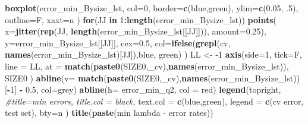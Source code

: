 \documentclass[
]{book}
\newenvironment{Shaded}{\begin{snugshade}}{\end{snugshade}}
\newcommand{\CommentTok}[1]{\textcolor[rgb]{0.56,0.35,0.01}{\textit{#1}}}
\newcommand{\ControlFlowTok}[1]{\textcolor[rgb]{0.13,0.29,0.53}{\textbf{#1}}}
\newcommand{\DataTypeTok}[1]{\textcolor[rgb]{0.13,0.29,0.53}{#1}}
\newcommand{\DecValTok}[1]{\textcolor[rgb]{0.00,0.00,0.81}{#1}}
\newcommand{\FloatTok}[1]{\textcolor[rgb]{0.00,0.00,0.81}{#1}}
\newcommand{\KeywordTok}[1]{\textcolor[rgb]{0.13,0.29,0.53}{\textbf{#1}}}
\newcommand{\NormalTok}[1]{#1}
\newcommand{\OperatorTok}[1]{\textcolor[rgb]{0.81,0.36,0.00}{\textbf{#1}}}
\newcommand{\StringTok}[1]{\textcolor[rgb]{0.31,0.60,0.02}{#1}}
\begin{document}
\begin{Shaded}
\begin{Highlighting}[]
\KeywordTok{boxplot}\NormalTok{(error\_min\_Bysize\_lst,}
  \DataTypeTok{col=}\DecValTok{0}\NormalTok{,}
  \DataTypeTok{border=}\KeywordTok{c}\NormalTok{(}\StringTok{\textquotesingle{}blue\textquotesingle{}}\NormalTok{,}\StringTok{\textquotesingle{}green\textquotesingle{}}\NormalTok{),}
  \DataTypeTok{ylim=}\KeywordTok{c}\NormalTok{(}\FloatTok{0.05}\NormalTok{, }\FloatTok{.5}\NormalTok{),}
  \DataTypeTok{outline=}\NormalTok{F,}
  \DataTypeTok{xaxt=}\StringTok{\textquotesingle{}n\textquotesingle{}}
\NormalTok{)}
\ControlFlowTok{for}\NormalTok{(JJ }\ControlFlowTok{in} \DecValTok{1}\OperatorTok{:}\KeywordTok{length}\NormalTok{(error\_min\_Bysize\_lst))}
\KeywordTok{points}\NormalTok{(}
   \DataTypeTok{x=}\KeywordTok{jitter}\NormalTok{(}\KeywordTok{rep}\NormalTok{(JJ, }\KeywordTok{length}\NormalTok{(error\_min\_Bysize\_lst[[JJ]])), }\DataTypeTok{amount=}\FloatTok{0.25}\NormalTok{), }
   \DataTypeTok{y=}\NormalTok{error\_min\_Bysize\_lst[[JJ]], }\DataTypeTok{cex=}\FloatTok{0.5}\NormalTok{,}
   \DataTypeTok{col=}\KeywordTok{ifelse}\NormalTok{(}\KeywordTok{grepl}\NormalTok{(}\StringTok{\textquotesingle{}cv\textquotesingle{}}\NormalTok{, }\KeywordTok{names}\NormalTok{(error\_min\_Bysize\_lst)[JJ]),}\StringTok{\textquotesingle{}blue\textquotesingle{}}\NormalTok{, }\StringTok{\textquotesingle{}green\textquotesingle{}}\NormalTok{)}
\NormalTok{)}
\NormalTok{LL <{-}}\StringTok{ }\DecValTok{{-}1}
\KeywordTok{axis}\NormalTok{(}\DataTypeTok{side=}\DecValTok{1}\NormalTok{, }\DataTypeTok{tick=}\NormalTok{F, }\DataTypeTok{line =}\NormalTok{ LL,}
  \DataTypeTok{at =} \KeywordTok{match}\NormalTok{(}\KeywordTok{paste0}\NormalTok{(SIZE0,}\StringTok{\textquotesingle{}\_cv\textquotesingle{}}\NormalTok{),}\KeywordTok{names}\NormalTok{(error\_min\_Bysize\_lst)),}
\NormalTok{  SIZE0}
\NormalTok{ )}
\KeywordTok{abline}\NormalTok{(}\DataTypeTok{v=} \KeywordTok{match}\NormalTok{(}\KeywordTok{paste0}\NormalTok{(SIZE0,}\StringTok{\textquotesingle{}\_cv\textquotesingle{}}\NormalTok{),}\KeywordTok{names}\NormalTok{(error\_min\_Bysize\_lst))[}\OperatorTok{{-}}\DecValTok{1}\NormalTok{] }\OperatorTok{{-}}\StringTok{ }\FloatTok{0.5}\NormalTok{, }\DataTypeTok{col=}\StringTok{\textquotesingle{}grey\textquotesingle{}}\NormalTok{)}
\KeywordTok{abline}\NormalTok{(}\DataTypeTok{h=}\NormalTok{ error\_min\_q2, }\DataTypeTok{col =} \StringTok{\textquotesingle{}red\textquotesingle{}}\NormalTok{)}
\KeywordTok{legend}\NormalTok{(}\StringTok{\textquotesingle{}topright\textquotesingle{}}\NormalTok{,}
   \CommentTok{\#title=\textquotesingle{}min errors\textquotesingle{}, title.col = \textquotesingle{}black\textquotesingle{},}
   \DataTypeTok{text.col =} \KeywordTok{c}\NormalTok{(}\StringTok{\textquotesingle{}blue\textquotesingle{}}\NormalTok{,}\StringTok{\textquotesingle{}green\textquotesingle{}}\NormalTok{),}
   \DataTypeTok{legend =} \KeywordTok{c}\NormalTok{(}\StringTok{\textquotesingle{}cv error\textquotesingle{}}\NormalTok{, }\StringTok{\textquotesingle{}test set\textquotesingle{}}\NormalTok{),}
   \DataTypeTok{bty=}\StringTok{\textquotesingle{}n\textquotesingle{}}
\NormalTok{ )}
\KeywordTok{title}\NormalTok{(}\KeywordTok{paste}\NormalTok{(}\StringTok{\textquotesingle{}min lambda {-} error rates\textquotesingle{}}\NormalTok{))}



\end{Highlighting}
\end{Shaded}
\end{document}
